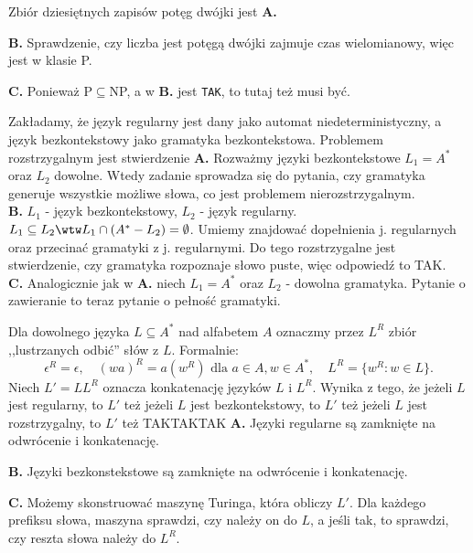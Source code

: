 \begin{solutions}
    \sol Zbiór dziesiętnych zapisów potęg dwójki jest
    \textbf{A.} 

    \textbf{B.} Sprawdzenie, czy liczba jest potęgą dwójki zajmuje czas wielomianowy, więc jest w klasie P.

    \textbf{C.} Ponieważ P$\subseteq$NP, a w \textbf{B.} jest \texttt{TAK}, to tutaj też musi być.

    \sol Zakładamy, że język regularny jest dany jako automat niedeterministyczny, a język bezkontekstowy jako gramatyka bezkontekstowa. Problemem rozstrzygalnym jest stwierdzenie
    \textbf{A.} Rozważmy języki bezkontekstowe $L_1 = A^*$ oraz $L_2$ dowolne. Wtedy zadanie sprowadza się do pytania, czy gramatyka generuje wszystkie możliwe słowa, co jest problemem nierozstrzygalnym. \\
    \textbf{B.} $L_1$ - język bezkontekstowy, $L_2$ - język regularny. $L_1 \subseteq L_2 \wtw L_1 \cap (A^* - L_2) = \emptyset$. Umiemy znajdować dopełnienia j. regularnych oraz przecinać gramatyki z j. regularnymi. Do tego rozstrzygalne jest stwierdzenie, czy gramatyka rozpoznaje słowo puste, więc odpowiedź to TAK. \\
    \textbf{C.} Analogicznie jak w \textbf{A.} niech $L_1 = A^*$ oraz $L_2$ - dowolna gramatyka. Pytanie o zawieranie to teraz pytanie o pełność gramatyki.

    \sol Dla dowolnego języka $L \subseteq A^*$ nad alfabetem $A$ oznaczmy przez $L^R$ zbiór ,,lustrzanych odbić'' słów z $L$. Formalnie: $$\epsilon^R = \epsilon, \quad (wa)^R = a(w^R) \text{ dla } a \in A, w \in A^*, \quad L^R = \{w^R : w \in L\}.$$ Niech $L' = LL^R$ oznacza konkatenację języków $L$ i $L^R$. Wynika z tego, że
    \answerss
    {jeżeli $L$ jest regularny, to $L'$ też}
    {jeżeli $L$ jest bezkontekstowy, to $L'$ też}
    {jeżeli $L$ jest rozstrzygalny, to $L'$ też}
    {TAK}{TAK}{TAK}
    \textbf{A.} Języki regularne są zamknięte na odwrócenie i konkatenację.

    \textbf{B.} Języki bezkonstekstowe są zamknięte na odwrócenie i konkatenację.

    \textbf{C.} Możemy skonstruować maszynę Turinga, która obliczy $L'$. Dla każdego prefiksu słowa, maszyna sprawdzi, czy należy on do $L$, a jeśli tak, to sprawdzi, czy reszta słowa należy do $L^R$.


\end{solutions}
